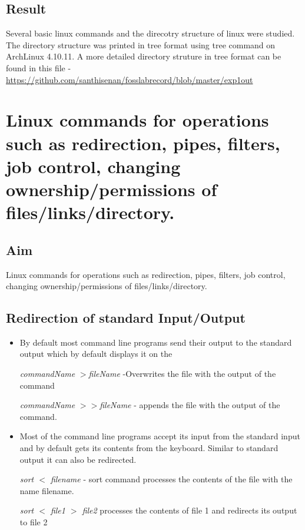 \documentclass{article}
\begin{document}
\subsection{Result}
Several basic linux commands and the direcotry structure of linux were studied. The directory structure was printed in tree format using tree command on ArchLinux 4.10.11. A more detailed directory struture in tree format can be found in this file - \url{https://github.com/santhisenan/fosslabrecord/blob/master/exp1out}
\begin{refsection}
\cite{commands}
\cite{directorystructure}
\printbibliography
\end{refsection}
\newpage
\section{Linux commands for operations such as redirection, pipes, filters, job control, changing ownership/permissions of files/links/directory.}

\subsection{Aim}
Linux commands for operations such as redirection, pipes, filters, job control, changing ownership/permissions of files/links/directory.

\subsection{Redirection of standard Input/Output}
\begin{itemize}
\item By default most command line programs send their output to the standard output which by default displays it on the 

\hspace{10mm} \textit{commandName} $>$\textit{fileName} -Overwrites the file with the output of the command

\hspace{10mm} \textit{commandName} $>>$\textit{fileName} - appends the file with the output of the command.

\item Most of the command line programs accept its input from the standard input and by default gets its contents from the keyboard. Similar to standard output it can also be redirected.

\textit{sort $<$ filename} - sort command processes the contents of the file with the name filename.

\hspace{10mm} \textit{sort $<$ file1 $>$ file2} processes the contents of file 1 and redirects its output to file 2

\end{itemize}
\end{document}
